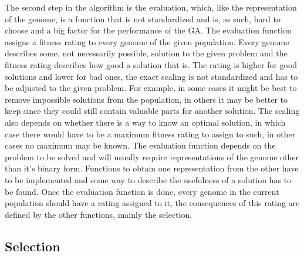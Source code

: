 The second step in the algorithm is the evaluation, which, like the representation of the genome, is a function that is not standardized and is, as such, hard to choose and a big factor for the performance of the GA. The evaluation function assigns a fitness rating to every genome of the given population. Every genome describes some, not necessarily possible, solution to the given problem and the fitness rating describes how good a solution that is. The rating is higher for good solutions and lower for bad ones, the exact scaling is not standardized and has to be adjusted to the given problem. For example, in some cases it might be best to remove impossible solutions from the population, in others it may be better to keep since they could still contain valuable parts for another solution. The scaling also depends on whether there is a way to know an optimal solution, in which case there would have to be a maximum fitness rating to assign to such, in other cases no maximum may be known.
The evaluation function depends on the problem to be solved and will usually require representations of the genome other than it's binary form. Functions to obtain one representation from the other have to be implemented and some way to describe the usefulness of a solution has to be found.
Once the evaluation function is done, every genome in the current population should have a rating assigned to it, the consequences of this rating are defined by the other functions, mainly the selection.

\subsection{Selection}
\label{sec:selection}

